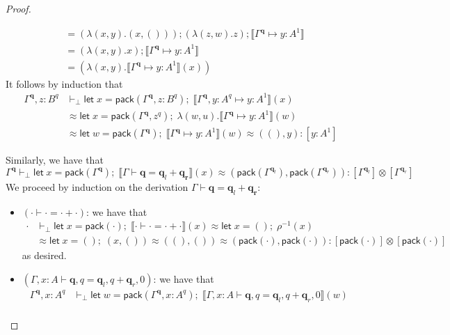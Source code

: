 \documentclass[acmsmall,screen,anonymous,review]{acmart}
\newcommand{\mb}[1]{\ensuremath{\mathbf{#1}}}
\newcommand{\ms}[1]{\ensuremath{\mathsf{#1}}}
\newcommand{\letexpr}[3]{\ensuremath{\ms{let}\;#1 = #2;\;#3}}
\newcommand{\qsp}[4]{#1 \vdash #2 = #3 + #4}
\newcommand{\cwk}[2]{#1 \mapsto #2}
\newcommand{\dnt}[1]{\llbracket{#1}\rrbracket}
\begin{document}
\begin{proof}
\begin{itemize}
\begin{align*}
    &= (\lambda (x, y) . (x, ())) ; (\lambda (z, w) . z) ; \dnt{\cwk{\Gamma^{\mb{q}}}{y : A^1}} \\
    &= (\lambda (x, y) . x) ; \dnt{\cwk{\Gamma^{\mb{q}}}{y : A^1}} \\
    &= (\lambda (x, y) . \dnt{\cwk{\Gamma^{\mb{q}}}{y : A^1}}(x))
    \end{align*}
    It follows by induction that
    \begin{align*}
    \Gamma^{\mb{q}}, z : B^q & \vdash_\bot
    \letexpr{x}{\ms{pack}(\Gamma^{\mb{q}}, z : B^q)}  
      {\dnt{\cwk{\Gamma^{\mb{q}}, y : A^q}{y : A^1}}(x)} \\
    &\approx \letexpr{x}{\ms{pack}(\Gamma^{\mb{q}}, z^q)}  
        {\lambda (w, u) . \dnt{\cwk{\Gamma^{\mb{q}}}{y : A^1}}(w)} \\
    &\approx \letexpr{w}{\ms{pack}(\Gamma^{\mb{q}})}{\dnt{\cwk{\Gamma^{\mb{q}}}{y : A^1}}(w)}
      \approx ((), y)
      : [y : A^1]
    \end{align*}
  \end{itemize}
  Similarly, we have that
  \begin{equation*}
  \Gamma^{\mb{q}} \vdash_\bot 
    \letexpr{x}{\ms{pack}(\Gamma^{\mb{q}})}{\dnt{\qsp{\Gamma}{\mb{q}}{\mb{q}_l}{\mb{q_r}}}(x)}
    \approx (\ms{pack}(\Gamma^{\mb{q}_l}), \ms{pack}(\Gamma^{\mb{q}_r}))
    : [\Gamma^{\mb{q}_l}] \otimes [\Gamma^{\mb{q}_r}]
  \end{equation*}
  We proceed by induction on the derivation $\qsp{\Gamma}{\mb{q}}{\mb{q}_l}{\mb{q_r}}$:
  \begin{itemize}
    \item $(\qsp{\cdot}{\cdot}{\cdot}{\cdot})$: we have that
    \begin{align*}
      \cdot &\vdash_\bot 
        \letexpr{x}{\ms{pack}(\cdot)}{\dnt{\qsp{\cdot}{\cdot}{\cdot}{\cdot}}(x)} 
        \approx \letexpr{x}{()}{\rho^{-1}(x)} \\
        &\approx \letexpr{x}{()}{(x, ())}
        \approx ((), ())
        \approx (\ms{pack}(\cdot), \ms{pack}(\cdot))
        : [\ms{pack}(\cdot)] \otimes [\ms{pack}(\cdot)]
    \end{align*}
    as desired.
    \item $(\qsp{\Gamma, x : A}{\mb{q}, q}{\mb{q}_l, q}{\mb{q}_r, 0})$: we have that
    \begin{align*}
      \Gamma^{\mb{q}}, x : A^q &\vdash_\bot
        \letexpr{w}{\ms{pack}(\Gamma^{\mb{q}}, x : A^q)}
          {\dnt{\qsp{\Gamma, x : A}{\mb{q}, q}{\mb{q}_l, q}{\mb{q}_r, 0}}(w)} \\

\end{align*}
\end{itemize}
\end{proof}
\end{document}
